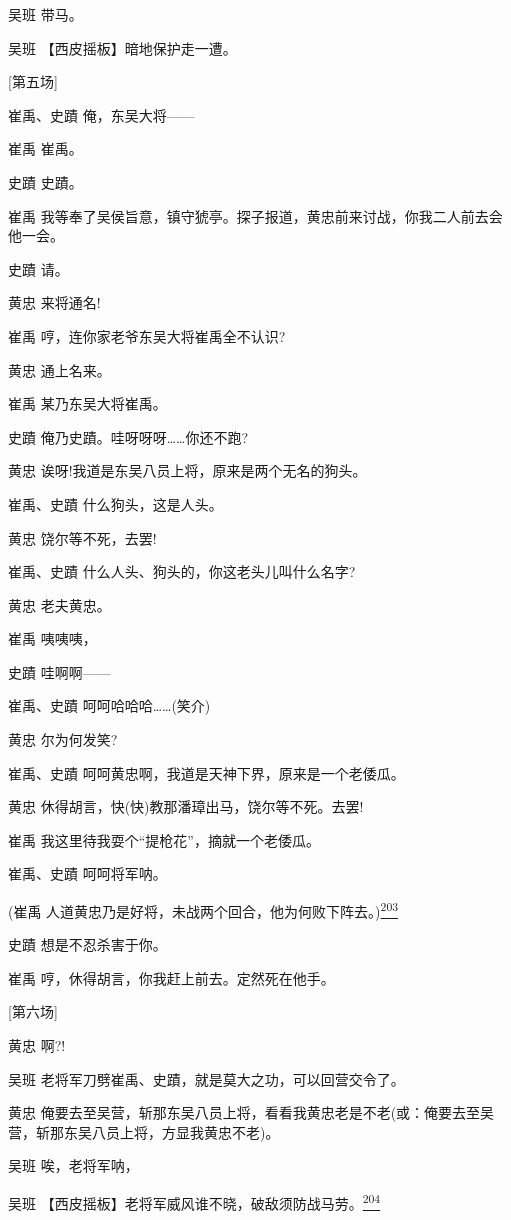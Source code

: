 吴班 带马。

吴班 【西皮摇板】暗地保护走一遭。

{[}第五场{]}

崔禹、史蹟 俺，东吴大将------

崔禹 崔禹。

史蹟 史蹟。

崔禹
我等奉了吴侯旨意，镇守猇亭。探子报道，黄忠前来讨战，你我二人前去会他一会。

史蹟 请。

黄忠 来将通名!

崔禹 哼，连你家老爷东吴大将崔禹全不认识?

黄忠 通上名来。

崔禹 某乃东吴大将崔禹。

史蹟 俺乃史蹟。哇呀呀呀\ldots{}\ldots{}你还不跑?

黄忠 诶呀!我道是东吴八员上将，原来是两个无名的狗头。

崔禹、史蹟 什么狗头，这是人头。

黄忠 饶尔等不死，去罢!

崔禹、史蹟 什么人头、狗头的，你这老头儿叫什么名字?

黄忠 老夫黄忠。

崔禹 咦咦咦，

史蹟 哇啊啊------

崔禹、史蹟 呵呵哈哈哈\ldots{}\ldots{}(笑介)

黄忠 尔为何发笑?

崔禹、史蹟 呵呵黄忠啊，我道是天神下界，原来是一个老倭瓜。

黄忠 休得胡言，快(快)教那潘璋出马，饶尔等不死。去罢!

崔禹 我这里待我耍个``提枪花''，摘就一个老倭瓜。

崔禹、史蹟 呵呵将军呐。

(崔禹
人道黄忠乃是好将，未战两个回合，他为何败下阵去。)\protect\hyperlink{fn203}{\textsuperscript{203}}

史蹟 想是不忍杀害于你。

崔禹 哼，休得胡言，你我赶上前去。定然死在他手。

{[}第六场{]}

黄忠 啊?!

吴班 老将军刀劈崔禹、史蹟，就是莫大之功，可以回营交令了。

黄忠
俺要去至吴营，斩那东吴八员上将，看看我黄忠老是不老(或：俺要去至吴营，斩那东吴八员上将，方显我黄忠不老)。

吴班 唉，老将军呐，

吴班
【西皮摇板】老将军威风谁不晓，破敌须防战马劳。\protect\hyperlink{fn204}{\textsuperscript{204}}

